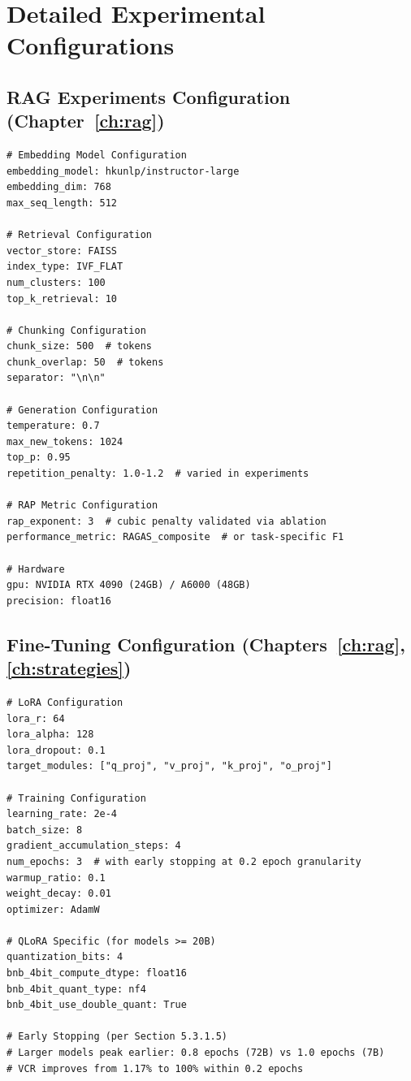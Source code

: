 \section{Detailed Experimental Configurations}
\label{app:exp_configs}

\subsection{RAG Experiments Configuration (Chapter~\ref{ch:rag})}

\begin{verbatim}
# Embedding Model Configuration
embedding_model: hkunlp/instructor-large
embedding_dim: 768
max_seq_length: 512

# Retrieval Configuration
vector_store: FAISS
index_type: IVF_FLAT
num_clusters: 100
top_k_retrieval: 10

# Chunking Configuration
chunk_size: 500  # tokens
chunk_overlap: 50  # tokens
separator: "\n\n"

# Generation Configuration
temperature: 0.7
max_new_tokens: 1024
top_p: 0.95
repetition_penalty: 1.0-1.2  # varied in experiments

# RAP Metric Configuration
rap_exponent: 3  # cubic penalty validated via ablation
performance_metric: RAGAS_composite  # or task-specific F1

# Hardware
gpu: NVIDIA RTX 4090 (24GB) / A6000 (48GB)
precision: float16
\end{verbatim}

\subsection{Fine-Tuning Configuration (Chapters~\ref{ch:rag}, \ref{ch:strategies})}

\begin{verbatim}
# LoRA Configuration
lora_r: 64
lora_alpha: 128
lora_dropout: 0.1
target_modules: ["q_proj", "v_proj", "k_proj", "o_proj"]

# Training Configuration
learning_rate: 2e-4
batch_size: 8
gradient_accumulation_steps: 4
num_epochs: 3  # with early stopping at 0.2 epoch granularity
warmup_ratio: 0.1
weight_decay: 0.01
optimizer: AdamW

# QLoRA Specific (for models >= 20B)
quantization_bits: 4
bnb_4bit_compute_dtype: float16
bnb_4bit_quant_type: nf4
bnb_4bit_use_double_quant: True

# Early Stopping (per Section 5.3.1.5)
# Larger models peak earlier: 0.8 epochs (72B) vs 1.0 epochs (7B)
# VCR improves from 1.17% to 100% within 0.2 epochs
\end{verbatim}

